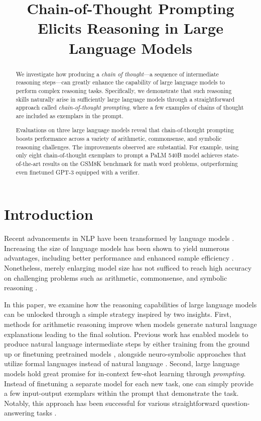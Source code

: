\title{Chain-of-Thought Prompting Elicits Reasoning in Large Language Models}

\begin{abstract}
We investigate how producing a \textit{chain of thought}—a sequence of intermediate reasoning steps—can greatly enhance the capability of large language models to perform complex reasoning tasks. Specifically, we demonstrate that such reasoning skills naturally arise in sufficiently large language models through a straightforward approach called \textit{chain-of-thought prompting}, where a few examples of chains of thought are included as exemplars in the prompt.

Evaluations on three large language models reveal that chain-of-thought prompting boosts performance across a variety of arithmetic, commonsense, and symbolic reasoning challenges. The improvements observed are substantial. For example, using only eight chain-of-thought exemplars to prompt a PaLM 540B model achieves state-of-the-art results on the GSM8K benchmark for math word problems, outperforming even finetuned GPT-3 equipped with a verifier.
\end{abstract}

\section{Introduction}
Recent advancements in NLP have been transformed by language models \citep[][\textit{inter alia}]{peters-etal-2018-deep,devlin-etal-2019-bert,brown2020language}. Increasing the size of language models has been shown to yield numerous advantages, including better performance and enhanced sample efficiency \citep[\textit{inter alia}]{kaplan2020scaling,brown2020language}. Nonetheless, merely enlarging model size has not sufficed to reach high accuracy on challenging problems such as arithmetic, commonsense, and symbolic reasoning \citep{rae2021scaling}.

In this paper, we examine how the reasoning capabilities of large language models can be unlocked through a simple strategy inspired by two insights. First, methods for arithmetic reasoning improve when models generate natural language explanations leading to the final solution. Previous work has enabled models to produce natural language intermediate steps by either training from the ground up \citep{ling-etal-2017-program} or finetuning pretrained models \citep{cobbe2021training}, alongside neuro-symbolic approaches that utilize formal languages instead of natural language \citep{roy-roth-2015-solving, chiang-chen-2019-semantically,amini-etal-2019-mathqa, chen2019neural}. Second, large language models hold great promise for in-context few-shot learning through \emph{prompting}. Instead of finetuning a separate model for each new task, one can simply provide a few input-output exemplars within the prompt that demonstrate the task. Notably, this approach has been successful for various straightforward question-answering tasks \citep{brown2020language}.

